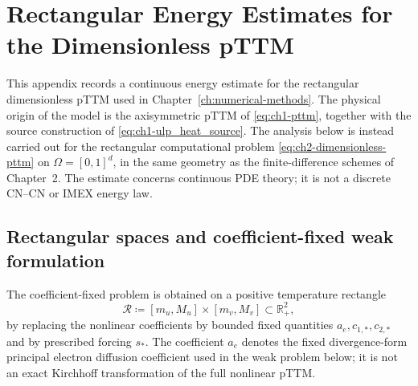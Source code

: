 \chapter{Rectangular Energy Estimates for the Dimensionless pTTM}
\label{app:ch2-rectangular-energy}

This appendix records a continuous energy estimate for the rectangular dimensionless pTTM used in Chapter~\ref{ch:numerical-methods}. The physical origin of the model is the axisymmetric pTTM of \eqref{eq:ch1-pttm}, together with the source construction of \eqref{eq:ch1-ulp_heat_source}. The analysis below is instead carried out for the rectangular computational problem \eqref{eq:ch2-dimensionless-pttm} on \(\Omega=[0,1]^d\), in the same geometry as the finite-difference schemes of Chapter~2.
The estimate concerns continuous PDE theory; it is not a discrete CN--CN or IMEX energy law.

\section{Rectangular spaces and coefficient-fixed weak formulation}
\label{sec:app-ch2-rectangular-spaces}

The coefficient-fixed problem is obtained on a positive temperature rectangle
\[
    \mathcal{R}\coloneqq [m_u,M_u]\times[m_v,M_v]\subset\mathbb{R}_{+}^{2},
\]
by replacing the nonlinear coefficients by bounded fixed quantities \(a_e,c_{1,*},c_{2,*}\) and by prescribed forcing \(s_*\). The coefficient \(a_e\) denotes the fixed divergence-form principal electron diffusion coefficient used in the weak problem below; it is not an exact Kirchhoff transformation of the full nonlinear pTTM.

